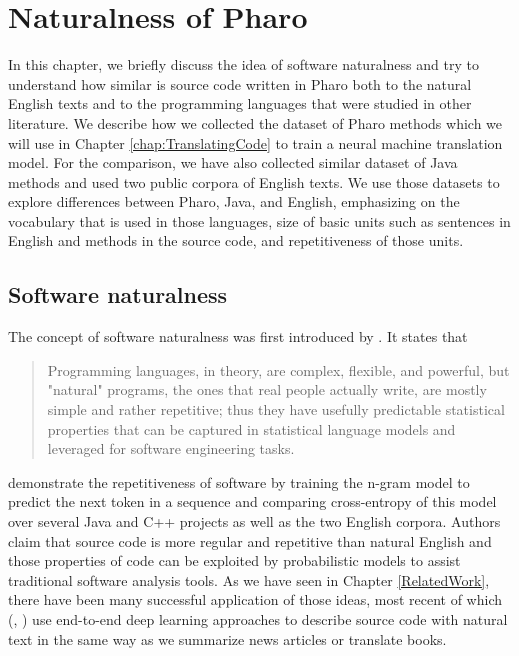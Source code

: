 \chapter{Naturalness of Pharo}
\label{chap:Naturalness}
\mtoc

In this chapter, we briefly discuss the idea of software naturalness and try to understand how similar is source code written in Pharo both to the natural English texts and to the programming languages that were studied in other literature. We describe how we collected the dataset of Pharo methods which we will use in Chapter \ref{chap:TranslatingCode} to train a neural machine translation model. For the comparison, we have also collected similar dataset of Java methods and used two public corpora of English texts. We use those datasets to explore differences between Pharo, Java, and English, emphasizing on the vocabulary that is used in those languages, size of basic units such as sentences in English and methods in the source code, and repetitiveness of those units.

\section{Software naturalness}

The concept of software naturalness was first introduced by \cite{Hind12}. It states that

\begin{quote}
Programming languages, in theory, are complex, flexible, and powerful, but "natural" programs, the ones that real people actually write, are mostly simple and rather repetitive; thus they have usefully predictable statistical properties that can be captured in statistical language models and leveraged for software engineering tasks.
\end{quote}

\cite{Hind12} demonstrate the repetitiveness of software by training the n-gram model to predict the next token in a sequence and comparing cross-entropy of this model over several Java and C++ projects as well as the two English corpora. Authors claim that source code is more regular and repetitive than natural English and those properties of code can be exploited by probabilistic models to assist traditional software analysis tools. As we have seen in Chapter \ref{RelatedWork}, there have been many successful application of those ideas, most recent of which (\cite{Alla16}, \cite{Iyer16}) use end-to-end deep learning approaches to describe source code with natural text in the same way as we summarize news articles or translate books.

